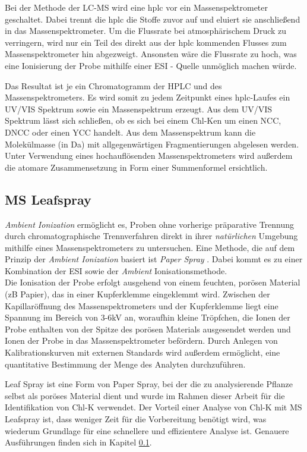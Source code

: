Bei der Methode der LC-MS wird eine \gls{hplc} vor ein Massenspektrometer geschaltet. Dabei trennt die \gls{hplc} die Stoffe zuvor auf und eluiert sie anschließend in das Massenspektrometer. \cite[S. 217-218]{MassSpectrometry} Um die Flussrate bei atmosphärischem Druck zu verringern, wird nur ein Teil des direkt aus der \gls{hplc} kommenden Flusses zum Massenspektrometer hin abgezweigt. Ansonsten wäre die Flussrate zu hoch, was eine Ionisierung der Probe mithilfe einer \gls{ESI} - Quelle unmöglich machen würde. \cite[S. 221]{MassSpectrometry} 

Das Resultat ist je ein Chromatogramm der HPLC und des Massenspektrometers. Es wird somit zu jedem Zeitpunkt eines \gls{hplc}-Laufes ein UV/VIS Spektrum sowie ein Massenspektrum erzeugt. Aus dem UV/VIS Spektrum lässt sich schließen, ob es sich bei einem \gls{Chl-K}en um einen \gls{NCC}, \gls{DNCC} oder einen \gls{YCC} handelt. Aus dem Massenspektrum kann die Molekülmasse (in Da) mit allgegenwärtigen Fragmentierungen abgelesen werden. Unter Verwendung eines hochauflösenden Massenspektrometers wird außerdem die atomare Zusammensetzung in Form einer Summenformel ersichtlich. \\

\subsection{MS Leafspray} \label{sec:MSLeafspray}

\textit{Ambient Ionization} \cite{AmbientIonisation} ermöglicht es, Proben ohne vorherige präparative Trennung durch chromatographische Trennverfahren direkt in ihrer \textit{natürlichen} Umgebung mithilfe eines Massenspektrometers zu untersuchen. Eine Methode, die auf dem Prinzip der \textit{Ambient Ionization} basiert ist \textit{Paper Spray} \cite{PaperSpray}. Dabei  kommt es zu einer Kombination der \gls{ESI} sowie der \textit{Ambient} Ionisationsmethode. \cite{PaperSpray}\\

Die Ionisation der Probe erfolgt ausgehend von einem feuchten, porösen Material (\gls{zB} Papier), das in einer Kupferklemme eingeklemmt wird. Zwischen der Kapillaröffnung des Massenspektrometers und der Kupferklemme liegt eine Spannung im Bereich von 3-6kV an, woraufhin kleine Tröpfchen, die Ionen der Probe enthalten von der Spitze des porösen Materials ausgesendet werden und Ionen der Probe in das Massenspektrometer befördern. \cite{RapidScreeningLeafSpray} Durch Anlegen von Kalibrationskurven mit externen Standards wird außerdem ermöglicht, eine quantitative Bestimmung der Menge des Analyten durchzuführen. \cite{LeafSpray}

Leaf Spray ist eine Form von Paper Spray, bei der die zu analysierende Pflanze selbst als poröses Material dient und wurde im Rahmen dieser Arbeit für die Identifikation von \gls{Chl-K} verwendet. Der Vorteil einer Analyse von \gls{Chl-K} mit MS Leafspray ist, dass weniger Zeit für die Vorbereitung benötigt wird, was wiederum Grundlage für eine schnellere und effizientere Analyse ist. Genauere Ausführungen finden sich in Kapitel \ref{sec:MSLeafspray}.\\